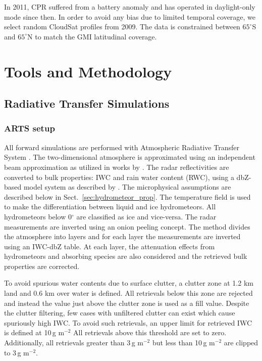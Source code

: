 \documentclass[amt, manuscript]{copernicus}
\begin{document}
In 2011, CPR suffered from a battery anomaly and has operated in daylight-only mode since then. In order to avoid any bias due to limited temporal coverage, we select random CloudSat profiles from 2009. The data is constrained between $65^{\circ}$S and $65^{\circ}$N to match the GMI latitudinal coverage. 


\section{Tools and Methodology}

\subsection{Radiative Transfer Simulations}
\label{sec:rt_simulations}

\subsubsection{ARTS setup}
\label{sec:arts_setup}
All forward simulations are performed with Atmospheric Radiative Transfer System \citep{eriksson:arts2:11}. The two-dimensional atmosphere is approximated using an independent beam approximation as utilized in works by \citet{ekelund2020using, eriksson:towar:20}. 
The radar reflectivities are converted to bulk properties: IWC and rain water content (RWC), using a dbZ-based model system as described by \citet{ekelund2020using}. The microphysical assumptions are described below in Sect.~\ref{sec:hydrometeor_prop}. The temperature field is used to make the differentiation between liquid and ice hydrometeors. All hydrometeors below 0$^{\circ}$ are classified as ice and vice-versa. The radar measurements are inverted using an onion peeling concept. The method  divides the atmosphere into layers and for each layer the measurements are inverted using an IWC-dbZ table. At each layer, the attenuation effects from hydrometeors and absorbing species are also considered and the retrieved bulk properties are corrected.

To avoid spurious water contents due to surface clutter, a clutter zone at 1.2\,\,km land and 0.6\,\,km over water is defined. All retrievals below this zone are rejected and instead the value just above the clutter zone is used as a fill value. Despite the clutter filtering, few cases with unfiltered clutter can exist which cause spuriously high IWC. To avoid such retrievals, an upper limit for retrieved IWC is defined at 10\,g m$^{-2}$ All retrievals above this threshold are set to zero. Additionally, all retrievals greater than 3\,g m$^{-2}$ but less than 10\,g m$^{-2}$ are clipped to 3\,g m$^{-2}$.
\end{document}
